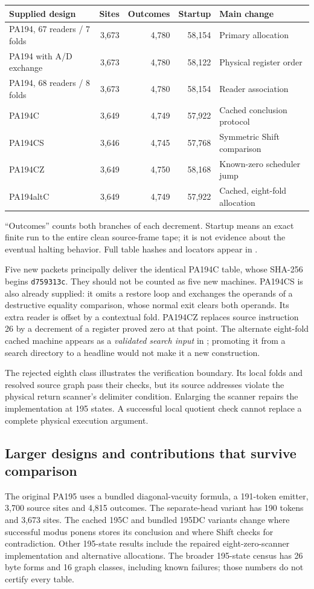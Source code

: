 \begin{center}\small
\begin{tabular}{@{}lrrrl@{}}
\toprule
Supplied design & Sites & Outcomes & Startup & Main change\\\midrule
PA194, 67 readers / 7 folds & 3,673 & 4,780 & 58,154 & Primary allocation\\
PA194 with A/D exchange & 3,673 & 4,780 & 58,122 & Physical register order\\
PA194, 68 readers / 8 folds & 3,673 & 4,780 & 58,154 & Reader association\\
PA194C & 3,649 & 4,749 & 57,922 & Cached conclusion protocol\\
PA194CS & 3,646 & 4,745 & 57,768 & Symmetric Shift comparison\\
PA194CZ & 3,649 & 4,750 & 58,168 & Known-zero scheduler jump\\
PA194altC & 3,649 & 4,749 & 57,922 & Cached, eight-fold allocation\\
\bottomrule
\end{tabular}
\end{center}
``Outcomes'' counts both branches of each decrement. Startup means an
exact finite run to the entire clean source-frame tape; it is not evidence
about the eventual halting behavior. Full table hashes and locators appear
in .

Five new packets principally deliver the identical PA194C table, whose
SHA-256 begins \texttt{d759313c}. They should not be counted as five new
machines. PA194CS is also already supplied: it omits a restore loop and
exchanges the operands of a destructive equality comparison, whose normal
exit clears both operands. Its extra reader is offset by a contextual fold.
PA194CZ replaces source instruction 26 by a decrement of a register proved
zero at that point. The alternate eight-fold cached machine appears as a
\emph{validated search input} in ; promoting it from
a search directory to a headline would not make it a new construction.

The rejected eighth class illustrates the verification boundary. Its local
folds and resolved source graph pass their checks, but its source addresses
violate the physical return scanner's delimiter condition. Enlarging the
scanner repairs the implementation at 195 states. A successful local
quotient check cannot replace a complete physical execution argument.

\subsection{Larger designs and contributions that survive comparison}
The original PA195 uses a bundled diagonal-vacuity formula, a 191-token
emitter, 3,700 source sites and 4,815 outcomes. The separate-head variant
has 190 tokens and 3,673 sites. The cached 195C and bundled 195DC variants
change where successful modus ponens stores its conclusion and where
Shift checks for contradiction. Other 195-state results include the
repaired eight-zero-scanner implementation and alternative allocations.
The broader 195-state census has 26 byte forms and 16 graph classes,
including known failures; those numbers do not certify every table.

